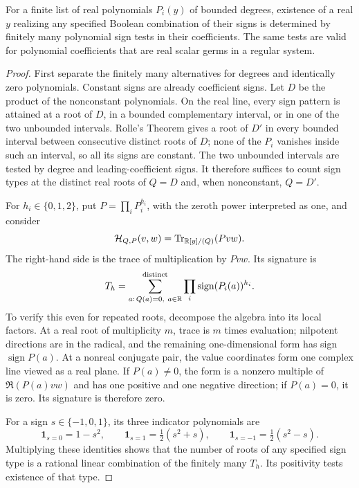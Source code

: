 \begin{lemma}\label{path:sign-elimination}
For a finite list of real polynomials \(P_i(y)\) of bounded degrees,
existence of a real \(y\) realizing any specified Boolean combination
of their signs is determined by finitely many polynomial sign tests
in their coefficients.  The same tests are valid for polynomial
coefficients that are real scalar germs in a regular system.
\end{lemma}
\begin{proof}
First separate the finitely many alternatives for degrees and
identically zero polynomials.  Constant signs are already coefficient
signs.  Let \(D\) be the product of the nonconstant polynomials.
On the real line, every sign pattern is attained at a root of \(D\),
in a bounded complementary interval, or in one of the two unbounded
intervals.  Rolle's Theorem gives a root of \(D'\) in every bounded
interval between consecutive distinct roots of \(D\); none of the
\(P_i\) vanishes inside such an interval, so all its signs are constant.
The two unbounded intervals are tested by degree and leading-coefficient
signs.  It therefore suffices to count sign types at the distinct real
roots of \(Q=D\) and, when nonconstant, \(Q=D'\).

For \(h_i\in\{0,1,2\}\), put \(P=\prod_iP_i^{h_i}\), with the
zeroth power interpreted as one, and consider
\begin{equation}\label{path:eq-trace-form}
 \mathcal H_{Q,P}(v,w)
 =\operatorname{Tr}_{\mathbb{R}[y]/(Q)}(Pvw).
\end{equation}
The right-hand side is the trace of multiplication by \(Pvw\).
Its signature is
\[
 T_h=\sum_{a:\,Q(a)=0,\ a\in\R}^{\text{distinct}}
             \prod_i\operatorname{sign}(P_i(a))^{h_i}.
\]
To verify this even for repeated roots, decompose the algebra into its
local factors.  At a real root of multiplicity \(m\), trace is
\(m\) times evaluation; nilpotent directions are in the radical,
and the remaining one-dimensional form has sign
\(\operatorname{sign}P(a)\).  At a nonreal conjugate pair, the value
coordinates form one complex line viewed as a real plane.  If
\(P(a)\ne0\), the form is a nonzero multiple of
\(\Re(P(a)vw)\) and has one positive and one negative direction;
if \(P(a)=0\), it is zero.  Its signature is therefore zero.

For a sign \(s\in\{-1,0,1\}\), its three indicator polynomials are
\[
 \mathbf 1_{s=0}=1-s^2,\qquad
 \mathbf 1_{s=1}=\tfrac12(s^2+s),\qquad
 \mathbf 1_{s=-1}=\tfrac12(s^2-s).
\]
Multiplying these identities shows that the number of roots of any
specified sign type is a rational linear combination of the finitely
many \(T_h\).  Its positivity tests existence of that type.


\end{proof}
